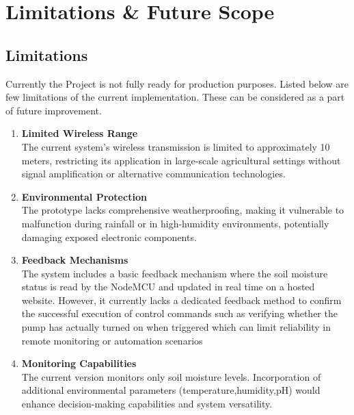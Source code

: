 \chapter{Limitations \& Future Scope}
\section{Limitations}
Currently the Project is not fully ready for production purposes. Listed below are few limitations of the current implementation. These can be considered as a part of future improvement.
\begin{enumerate}
  \item \textbf{Limited Wireless Range} \\
    The current system's wireless transmission is limited to approximately 10 meters, restricting its application in large-scale agricultural settings without signal amplification or alternative communication technologies.
  \item \textbf{Environmental Protection} \\
    The prototype lacks comprehensive weatherproofing, making it vulnerable to malfunction during rainfall or in high-humidity environments, potentially damaging exposed electronic components.
  \item \textbf{Feedback Mechanisms} \\
    The system includes a basic feedback mechanism where the soil moisture status is read by the NodeMCU and updated in real time on a hosted website. However, it currently lacks a dedicated feedback method to confirm the successful execution of control commands such as verifying whether the pump has actually turned on when triggered which can limit reliability in remote monitoring or automation scenarios
  \item \textbf{Monitoring Capabilities} \\
    The current version monitors only soil moisture levels. Incorporation of additional environmental parameters (temperature,humidity,pH) would enhance decision-making capabilities and system versatility.
\end{enumerate}


